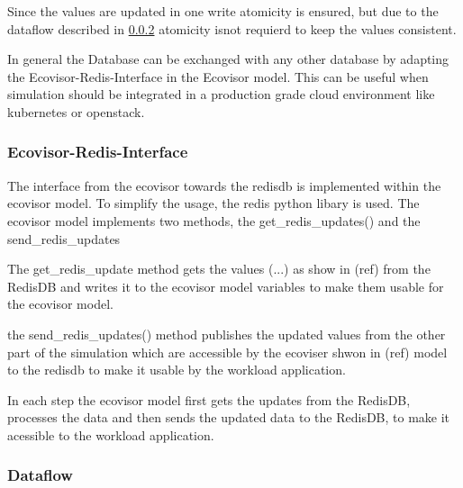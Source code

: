 Since the values are updated in one write atomicity is ensured, but due to the dataflow described in \ref{subsec:dataflow}
atomicity isnot requierd to keep the values consistent.

In general the Database can be exchanged with any other database by adapting the Ecovisor-Redis-Interface in the Ecovisor model. This can be useful when simulation should be integrated 
in a production grade cloud environment like kubernetes or openstack.


\subsubsection{Ecovisor-Redis-Interface}
The interface from the ecovisor towards the redisdb is implemented within the ecovisor model. To simplify the usage, the redis python libary %
is used. The ecovisor model implements two methods, the get_redis_updates() and the send_redis_updates %

The get_redis_update method gets the values (...) as show in (ref) from the RedisDB %
and writes it to the ecovisor model variables to make them usable for the ecovisor model.

the send_redis_updates() method publishes the updated values from the other part of the simulation which are accessible by the ecoviser shwon in (ref) model to the redisdb to make it
usable by the workload application. %

In each step the ecovisor model first gets the updates from the RedisDB, processes the data and then sends the updated data to the RedisDB, to make it
acessible to the workload application.  

\subsubsection{Dataflow}\label{subsec:dataflow}

